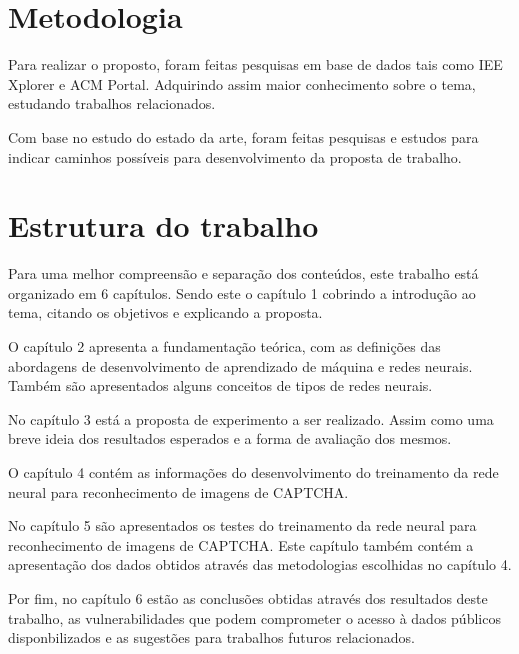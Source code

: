 \section{Metodologia}

Para realizar o proposto, foram feitas pesquisas em base de dados tais
como IEE Xplorer e ACM Portal. Adquirindo assim maior conhecimento
sobre o tema, estudando trabalhos relacionados. 

Com base no estudo do estado da arte, foram feitas pesquisas e
estudos para indicar caminhos possíveis para desenvolvimento da
proposta de trabalho.

\section{Estrutura do trabalho}

Para uma melhor compreensão e separação dos conteúdos, este trabalho
está organizado em 6 capítulos. Sendo este o capítulo 1 cobrindo a
introdução ao tema, citando os objetivos e explicando a proposta.

O capítulo 2 apresenta a fundamentação teórica, com as definições das
abordagens de desenvolvimento de aprendizado de máquina e redes
neurais. Também são apresentados alguns conceitos de tipos de redes
neurais.

No capítulo 3 está a proposta de experimento a ser realizado. Assim
como uma breve ideia dos resultados esperados e a forma de avaliação
dos mesmos.

O capítulo 4 contém as informações do desenvolvimento do treinamento
da rede neural para reconhecimento de imagens de CAPTCHA.

No capítulo 5 são apresentados os testes do treinamento da rede neural
para reconhecimento de imagens de CAPTCHA. Este capítulo também contém
a apresentação dos dados obtidos através das metodologias escolhidas
no capítulo 4.

Por fim, no capítulo 6 estão as conclusões obtidas através dos
resultados deste trabalho, as vulnerabilidades que podem comprometer o
acesso à dados públicos disponbilizados e as sugestões para trabalhos
futuros relacionados.
